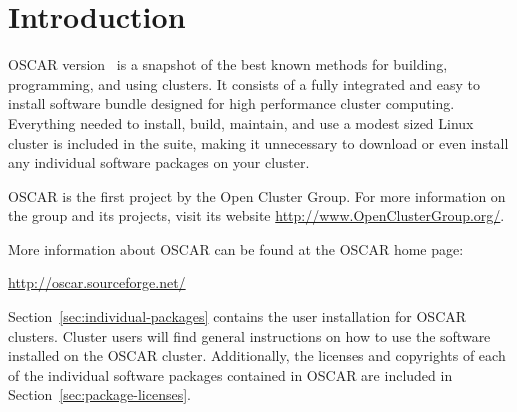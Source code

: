 %
%
%

\section{Introduction}

OSCAR version \oscarversion\ is a snapshot of the best known methods
for building, programming, and using clusters. It consists of a
fully integrated and easy to install software bundle designed for
high performance cluster computing. Everything needed to install,
build, maintain, and use a modest sized Linux cluster is included in
the suite, making it unnecessary to download or even install any
individual software packages on your cluster.

OSCAR is the first project by the Open Cluster Group. For more
information on the group and its projects, visit its website
\url{http://www.OpenClusterGroup.org/}.

More information about OSCAR can be found at the OSCAR home page:

\vspace{10pt}
\centerline{\url{http://oscar.sourceforge.net/}}
\vspace{10pt}

Section~\ref{sec:individual-packages} contains the user installation
for OSCAR clusters.  Cluster users will find general instructions on
how to use the software installed on the OSCAR cluster.  Additionally,
the licenses and copyrights of each of the individual software
packages contained in OSCAR are included in
Section~\ref{sec:package-licenses}.
